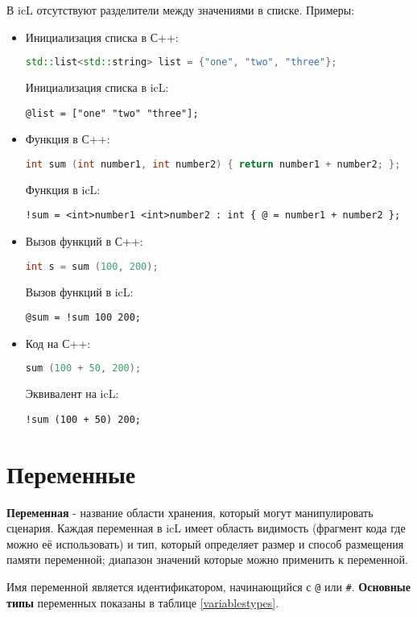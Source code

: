 \documentclass[a4paper, 14pt, russian]{extarticle}
\newenvironment{icItems}
	{ \begin{itemize} [noitemsep,nolistsep] }
	{ \end{itemize} }
\begin{document}
	В icL отсутствуют разделители между значениями в списке. Примеры:
\begin{icItems}
  \item Инициализация списка в С++:
\begin{lstlisting}[numbers=none, language=C++]
std::list<std::string> list = {"one", "two", "three"};
\end{lstlisting}
	Инициализация списка в icL:
\begin{lstlisting}[numbers=none]
@list = ["one" "two" "three"];
\end{lstlisting}
  \item Функция в С++:
\begin{lstlisting}[numbers=none, language=C++]
int sum (int number1, int number2) { return number1 + number2; };
\end{lstlisting}
	Функция в icL:
\begin{lstlisting}[numbers=none]
!sum = <int>number1 <int>number2 : int { @ = number1 + number2 };
\end{lstlisting}
  \item Вызов функций в С++:
\begin{lstlisting}[numbers=none, language=C++]
int s = sum (100, 200);
\end{lstlisting}
	Вызов функций в icL:
\begin{lstlisting}[numbers=none]
@sum = !sum 100 200;
\end{lstlisting}
  \item Код на С++:
\begin{lstlisting}[numbers=none, language=C++]
sum (100 + 50, 200);
\end{lstlisting}
	Эквивалент на icL:
\begin{lstlisting}[numbers=none]
!sum (100 + 50) 200;
\end{lstlisting}
\end{icItems}

\newpage
\section{Переменные}  
	
	\textbf{Переменная} - название области хранения, который могут манипулировать сценария. Каждая переменная в icL имеет область видимость (фрагмент кода где можно её использовать) и тип, который определяет размер и способ размещения памяти переменной; диапазон значений которые можно применить к переменной.
	
	Имя переменной является идентификатором, начинающийся с \lstinline`@` или {\color{blue2}\lstinline`#`}.
	\textbf{Основные типы} переменных показаны в таблице \ref{variablestypes}.
\end{document}
